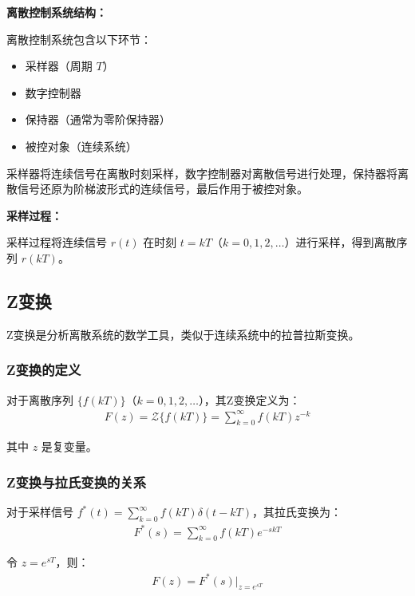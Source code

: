\begin{minipage}[t]{0.45\textwidth}
\vspace{0pt}
\textbf{离散控制系统结构：}

离散控制系统包含以下环节：
\begin{itemize}
    \item 采样器（周期 $T$）
    \item 数字控制器
    \item 保持器（通常为零阶保持器）
    \item 被控对象（连续系统）
\end{itemize}

采样器将连续信号在离散时刻采样，数字控制器对离散信号进行处理，保持器将离散信号还原为阶梯波形式的连续信号，最后作用于被控对象。

\vspace{0.3cm}
\textbf{采样过程：}

采样过程将连续信号 $r(t)$ 在时刻 $t = kT$（$k=0,1,2,\ldots$）进行采样，得到离散序列 $r(kT)$。
\end{minipage}

\subsection{Z变换}

Z变换是分析离散系统的数学工具，类似于连续系统中的拉普拉斯变换。

\subsubsection{Z变换的定义}

对于离散序列 $\{f(kT)\}$（$k = 0, 1, 2, \ldots$），其Z变换定义为：
\begin{align*}
F(z) = \mathcal{Z}\{f(kT)\} = \sum_{k=0}^{\infty} f(kT) z^{-k}
\end{align*}

其中 $z$ 是复变量。

\subsubsection{Z变换与拉氏变换的关系}

对于采样信号 $f^*(t) = \sum_{k=0}^{\infty} f(kT)\delta(t-kT)$，其拉氏变换为：
\begin{align*}
F^*(s) = \sum_{k=0}^{\infty} f(kT) e^{-skT}
\end{align*}

令 $z = e^{sT}$，则：
\begin{align*}
F(z) = F^*(s)\Big|_{z=e^{sT}}
\end{align*}

